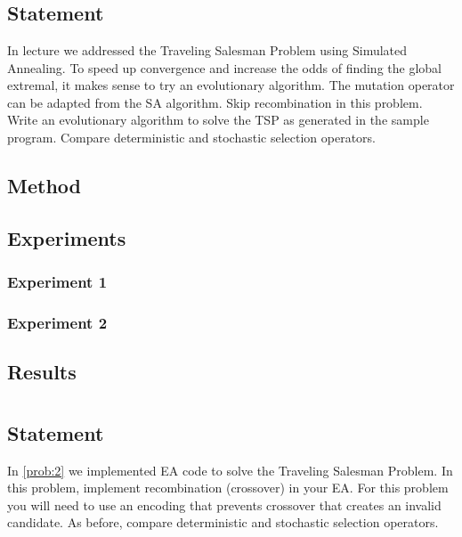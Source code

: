 \documentclass{article}
\begin{document}
\section{}\label{prob:2}
\subsection{Statement}
In lecture we addressed the Traveling Salesman Problem using Simulated Annealing. To speed up
convergence and increase the odds of finding the global extremal, it makes sense to try an
evolutionary algorithm. The mutation operator can be adapted from the SA algorithm. Skip
recombination in this problem. Write an evolutionary algorithm to solve the TSP as generated in the
sample program. Compare deterministic and stochastic selection operators.

\subsection{Method}
\subsection{Experiments}
\subsubsection{Experiment 1}
\subsubsection{Experiment 2}

\subsection{Results}

\section{}\label{prob:3}
\subsection{Statement}
In \autoref{prob:2} we implemented EA code to solve the Traveling Salesman Problem. In this
problem, implement recombination (crossover) in your EA. For this problem you will need to use an
encoding that prevents crossover that creates an invalid candidate. As before, compare
deterministic and stochastic selection operators.
\end{document}
